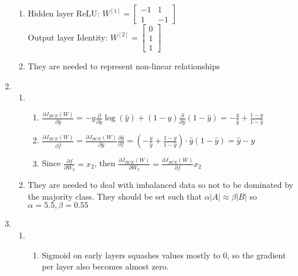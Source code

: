 \documentclass[12pt, a4paper]{article}
\begin{document}
\begin{enumerate}[\Alph*.]
\begin{enumerate}[\arabic*.]
      \item Hidden layer ReLU: $W^{[1]} = \begin{bmatrix}-1&1\\1&-1\end{bmatrix}$\\
        Output layer Identity: $W^{[2]} = \begin{bmatrix}0\\1\\1\end{bmatrix}$

      \item They are needed to represent non-linear relationships 
    \end{enumerate}

  \item 
    \begin{enumerate}[\arabic*.]
      \item 
        \begin{enumerate}[(\alph*.)]
          \item $\frac{\partial J_{BCE}(W)}{\partial \hat{y}} = -y \frac{\partial}{\partial \hat{y}}\log(\hat{y}) + (1-y) \frac{\partial}{\partial \hat{y}}(1-\hat{y}) = -\frac{y}{\hat{y}} + \frac{1-y}{1-\hat{y}}$

          \item $\frac{\partial J_{BCE}(W)}{\partial \hat{f}} = \frac{\partial J_{BCE}(W)}{\partial \hat{y}} \frac{\partial \hat{y}}{\partial f} = \left(-\frac{y}{\hat{y}} + \frac{1-y}{1-\hat{y}}\right) \cdot \hat{y}(1-\hat{y}) = \hat{y} - y$ 

          \item Since $\frac{\partial f}{\partial W_2} = x_2$, then $\frac{\partial J_{BCE}(W)}{\partial W_2} = \frac{\partial J_{BCE}(W)}{\partial f} x_2$
        \end{enumerate}

      \item They are needed to deal with imbalanced data so not to be dominated by the majority class. They should be set such that $\alpha |A| \approx \beta |B|$ so $\alpha = 5.5, \beta = 0.55$
    \end{enumerate}

  \item 
    \begin{enumerate}[\arabic*.]
      \item 
        \begin{enumerate}[(\alph*.)]
          \item Sigmoid on early layers squashes values mostly to 0, so the gradient per layer also becomes almost zero.


\end{enumerate}
\end{enumerate}
\end{enumerate}
\end{document}
